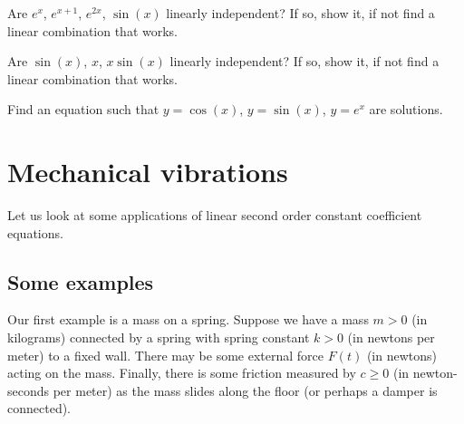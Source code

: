 \begin{exercise}
Are $e^{x}$, $e^{x+1}$, $e^{2x}$, $\sin(x)$ linearly independent?
If so, show it, if not find a linear combination that works.
\end{exercise}

\begin{exercise}
Are $\sin(x)$, $x$, $x\sin(x)$ linearly independent?
If so, show it, if not find a linear combination that works.
\end{exercise}

\begin{exercise}
Find an equation such that $y=\cos(x)$, $y=\sin(x)$, $y=e^x$ are solutions.
\end{exercise}


\sectionnewpage
\section{Mechanical vibrations} \label{sec:mv}


Let us look at some applications of linear second order constant
coefficient equations.

\subsection{Some examples}

\begin{mywrapfigsimp}{2.0in}{2.3in}
\noindent
{}
\end{mywrapfigsimp}
Our first example is a mass on a spring.  Suppose we have a mass $m > 0$
(in kilograms) connected
by a spring with spring constant $k > 0$ (in newtons per meter)
to a fixed wall.  There may be some external
force $F(t)$ (in newtons) acting on the mass.  Finally, there is some
friction measured by $c \geq 0$ (in newton-seconds per meter) as the mass
slides along the floor (or perhaps a damper is connected).

